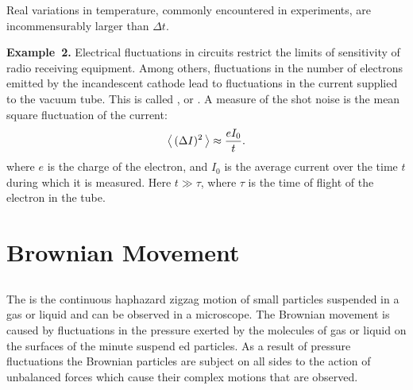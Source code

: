 Real variations in temperature, commonly encountered in experiments, are incommensurably larger than $\Delta t$.

\textbf{Example~2.} Electrical fluctuations in circuits restrict the lim­its of sensitivity of radio receiving equipment. Among others, fluctuations in the number of electrons emitted by the incandescent cathode lead to fluctuations in the current supplied to the vacuum tube. This is called , or . A measure of the shot noise is the mean square fluctuation of the current:
\begin{equation*}%
\expval{\,(\Delta I)^{2}\,} \approx \frac{e I_{0}}{t}.
\end{equation*}
where $e$ is the charge of the electron, and $I_{0}$ is the average current over the time $t$ during which it is measured. Here $t \gg \tau$, where $\tau$ is the time of flight of the electron in the tube.

\section{Brownian Movement}
\label{sec-11.7}

\subsection{}\label{11.7.1} The  is the continuous haphazard zig­zag motion of small particles suspended in a gas or liquid and can be observed in a microscope. The Brownian movement is caused by fluctuations  in the pressure exerted by the molecules of gas or liquid on the surfaces of the minute suspend­ ed particles. As a result of pressure fluctuations the Brownian particles are subject on all sides to the action of unbalanced forces which cause their complex motions that are observed. 

